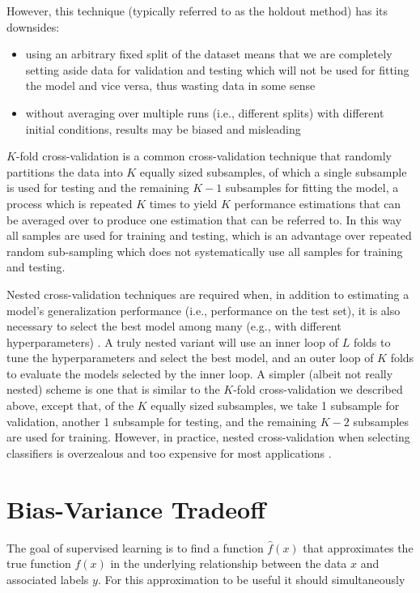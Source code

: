 However, this technique (typically referred to as the holdout method) has its downsides:

\begin{itemize}
    \item using an arbitrary fixed split of the dataset means that we are completely setting aside data for validation and testing which will not be used for fitting the model and vice versa, thus wasting data in some sense
    \item without averaging over multiple runs (i.e., different splits) with different initial conditions, results may be biased and misleading
\end{itemize}

$K$-fold cross-validation is a common cross-validation technique that randomly partitions the data into $K$ equally sized subsamples, of which a single subsample is used for testing and the remaining $K-1$ subsamples for fitting the model, a process which is repeated $K$ times to yield $K$ performance estimations that can be averaged over to produce one estimation that can be referred to. In this way all samples are used for training and testing, which is an advantage over repeated random sub-sampling which does not systematically use all samples for training and testing.

Nested cross-validation techniques are required when, in addition to estimating a model's generalization performance (i.e., performance on the test set), it is also necessary to select the best model among many (e.g., with different hyperparameters) \cite{crossvalidationbias}. A truly nested variant will use an inner loop of $L$ folds to tune the hyperparameters and select the best model, and an outer loop of $K$ folds to evaluate the models selected by the inner loop. A simpler (albeit not really nested) scheme is one that is similar to the $K$-fold cross-validation we described above, except that, of the $K$ equally sized subsamples, we take 1 subsample for validation, another 1 subsample for testing, and the remaining $K-2$ subsamples are used for training. However, in practice, nested cross-validation when selecting classifiers is overzealous and too expensive for most applications \cite{nestedcvoverzealous}.

\section{Bias-Variance Tradeoff}

The goal of supervised learning is to find a function $\hat{f}(x)$ that approximates the true function $f(x)$ in the underlying relationship between the data $x$ and associated labels $y$. For this approximation to be useful it should simultaneously

